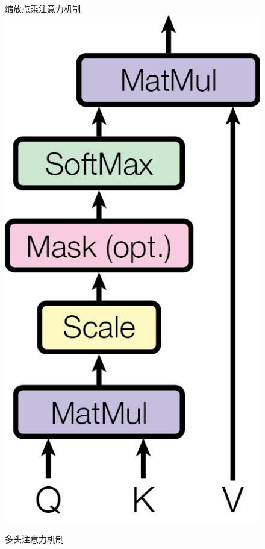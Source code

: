 \documentclass[lang=cn,a4paper,newtx]{elegantpaper}
\begin{document}
\begin{figure}
\begin{minipage}[t]{0.5\textwidth}
  \centering
  缩放点乘注意力机制 \\
  \vspace{0.5cm}
  \includegraphics[scale=0.6]{Figures/ModalNet-19}
\end{minipage}
\begin{minipage}[t]{0.5\textwidth}
  \centering 
  多头注意力机制 \\
  \vspace{0.1cm}

\end{minipage}
\end{figure}
\end{document}
